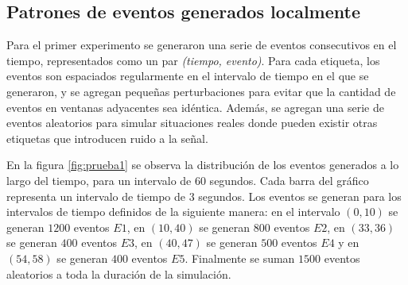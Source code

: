 \documentclass[a4paper,10pt, oneside]{article}
\begin{document}
\subsection{Patrones de eventos generados localmente}
Para el primer experimento se generaron una serie de eventos consecutivos en el tiempo, representados como un par \textit{(tiempo, evento)}. Para cada etiqueta, los eventos son espaciados regularmente en el intervalo de tiempo en el que se generaron, y se agregan pequeñas perturbaciones para evitar que la cantidad de eventos en ventanas adyacentes sea idéntica. Además, se agregan una serie de eventos aleatorios para simular situaciones reales donde pueden existir otras etiquetas que introducen ruido a la señal.

En la figura \ref{fig:prueba1} se observa la distribución de los eventos generados a lo largo del tiempo, para un intervalo de 60 segundos. Cada barra del gráfico representa un intervalo de tiempo de $3$ segundos.
Los eventos se generan para los intervalos de tiempo definidos de la siguiente manera: en el intervalo $(0,10)$ se generan $1200$ eventos $E1$, en $(10,40)$ se generan $800$ eventos $E2$, en $(33,36)$ se generan $400$ eventos $E3$, en $(40,47)$ se generan $500$ eventos $E4$ y en $(54,58)$ se generan $400$ eventos $E5$. Finalmente se suman $1500$ eventos aleatorios a toda la duración de la simulación. 
\end{document}
